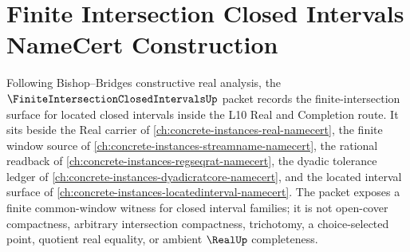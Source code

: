 \chapter{Finite Intersection Closed Intervals NameCert Construction}
\label{ch:concrete-instances-finite-intersection-closed-intervals-namecert}

Following Bishop--Bridges constructive real analysis, the $\FiniteIntersectionClosedIntervalsUp$ packet records the finite-intersection surface for located closed intervals inside the L10 Real and Completion route. It sits beside the Real carrier of \autoref{ch:concrete-instances-real-namecert}, the finite window source of \autoref{ch:concrete-instances-streamname-namecert}, the rational readback of \autoref{ch:concrete-instances-regseqrat-namecert}, the dyadic tolerance ledger of \autoref{ch:concrete-instances-dyadicratcore-namecert}, and the located interval surface of \autoref{ch:concrete-instances-locatedinterval-namecert}. The packet exposes a finite common-window witness for closed interval families; it is not open-cover compactness, arbitrary intersection compactness, trichotomy, a choice-selected point, quotient real equality, or ambient $\RealUp$ completeness.

